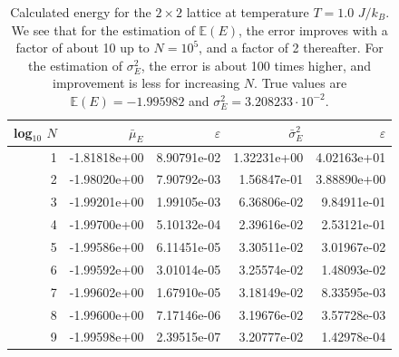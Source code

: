 \documentclass[]{article}
\begin{document}
\begin{table}[!h]
	\caption{Calculated energy for the $2 \times 2$ lattice at temperature $T=1.0$ $J/k_B$. We see that for the estimation of $\mathbb{E}(E)$, the error improves with a factor of about 10 up to $N = 10^5$, and a factor of 2 thereafter. For the estimation of $\sigma^2_E$, the error is about 100 times higher, and improvement is less for increasing $N$. True values are $\mathbb{E}(E) = -1.995982$ and $\sigma_E^2 = 3.208233 \cdot 10^{-2}$.}
	\label{tab:2x2-e-vals}
	\begin{center}
	\begin{tabular}{r|rr|rr}
		\toprule
		log$_{10}$ $N$ & $\bar{\mu}_E$ & $\varepsilon$ & $\bar{\sigma}^2_E$ & $\varepsilon$ \\
		\midrule
			1 & -1.81818e+00 & 8.90791e-02 & 1.32231e+00 & 4.02163e+01 \\
			2 & -1.98020e+00 & 7.90792e-03 & 1.56847e-01 & 3.88890e+00 \\
			3 & -1.99201e+00 & 1.99105e-03 & 6.36806e-02 & 9.84911e-01 \\
			4 & -1.99700e+00 & 5.10132e-04 & 2.39616e-02 & 2.53121e-01 \\
			5 & -1.99586e+00 & 6.11451e-05 & 3.30511e-02 & 3.01967e-02 \\
			6 & -1.99592e+00 & 3.01014e-05 & 3.25574e-02 & 1.48093e-02 \\
			7 & -1.99602e+00 & 1.67910e-05 & 3.18149e-02 & 8.33595e-03 \\
			8 & -1.99600e+00 & 7.17146e-06 & 3.19676e-02 & 3.57728e-03 \\
			9 & -1.99598e+00 & 2.39515e-07 & 3.20777e-02 & 1.42978e-04 \\
		\bottomrule
	\end{tabular}
	\end{center}
\end{table}
\end{document}
